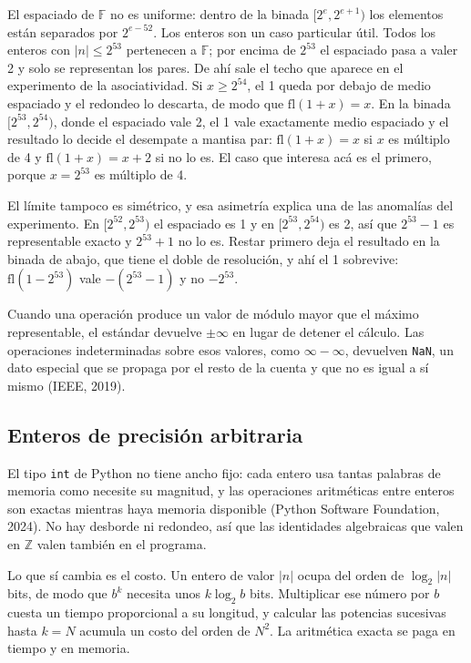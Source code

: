 El espaciado de $\mathbb{F}$ no es uniforme: dentro de la binada $[2^{e}, 2^{e+1})$ los elementos
están separados por $2^{e-52}$. Los enteros son un caso particular útil. Todos los enteros con
$|n| \le 2^{53}$ pertenecen a $\mathbb{F}$; por encima de $2^{53}$ el espaciado pasa a valer 2 y
solo se representan los pares. De ahí sale el techo que aparece en el experimento de la
asociatividad. Si $x \ge 2^{54}$, el 1 queda por debajo de medio espaciado y el redondeo lo
descarta, de modo que $\mathrm{fl}(1 + x) = x$. En la binada $[2^{53}, 2^{54})$, donde el
espaciado vale 2, el 1 vale exactamente medio espaciado y el resultado lo decide el desempate a
mantisa par: $\mathrm{fl}(1 + x) = x$ si $x$ es múltiplo de 4 y $\mathrm{fl}(1 + x) = x + 2$ si no
lo es. El caso que interesa acá es el primero, porque $x = 2^{53}$ es múltiplo de 4.

El límite tampoco es simétrico, y esa asimetría explica una de las anomalías del experimento. En
$[2^{52}, 2^{53})$ el espaciado es 1 y en $[2^{53}, 2^{54})$ es 2, así que $2^{53} - 1$ es
representable exacto y $2^{53} + 1$ no lo es. Restar primero deja el resultado en la binada de
abajo, que tiene el doble de resolución, y ahí el 1 sobrevive: $\mathrm{fl}(1 - 2^{53})$ vale
$-(2^{53} - 1)$ y no $-2^{53}$.

Cuando una operación produce un valor de módulo mayor que el máximo representable, el estándar
devuelve $\pm\infty$ en lugar de detener el cálculo. Las operaciones indeterminadas sobre esos
valores, como $\infty - \infty$, devuelven \texttt{NaN}, un dato especial que se propaga por el
resto de la cuenta y que no es igual a sí mismo (IEEE, 2019).

\subsection{Enteros de precisión arbitraria}
\label{subsec:enteros}

El tipo \texttt{int} de Python no tiene ancho fijo: cada entero usa tantas palabras de memoria como
necesite su magnitud, y las operaciones aritméticas entre enteros son exactas mientras haya memoria
disponible (Python Software Foundation, 2024). No hay desborde ni redondeo, así que las identidades
algebraicas que valen en $\mathbb{Z}$ valen también en el programa.

Lo que sí cambia es el costo. Un entero de valor $|n|$ ocupa del orden de $\log_2 |n|$ bits, de modo
que $b^{k}$ necesita unos $k \log_2 b$ bits. Multiplicar ese número por $b$ cuesta un tiempo
proporcional a su longitud, y calcular las potencias sucesivas hasta $k = N$ acumula un costo del
orden de $N^{2}$. La aritmética exacta se paga en tiempo y en memoria.

